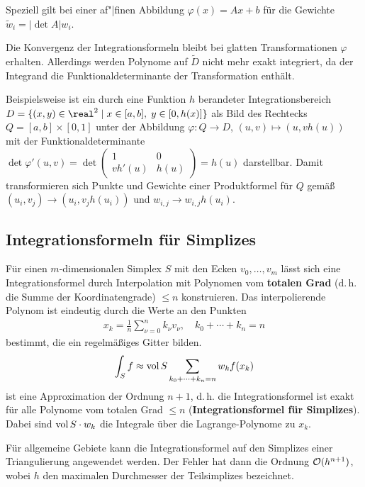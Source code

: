 Speziell gilt bei einer af"|finen Abbildung
$\varphi(x) = Ax + b$ für die Gewichte
$\widetilde{w}_i = |\det A| w_i$.

Die Konvergenz der Integrationsformeln bleibt bei glatten Transformationen
$\varphi$ erhalten.
Allerdings werden Polynome auf $\widetilde{D}$ nicht mehr exakt integriert, da
der Integrand die Funktionaldeterminante der Transformation enthält.

\linie

Beispielsweise ist ein durch eine Funktion $h$ berandeter
Integrationsbereich \\
$D = \{(x, y) \in \real^2 \;|\; x \in [a, b],\; y \in [0, h(x)]\}$
als Bild des Rechtecks $Q = [a, b] \times [0, 1]$ unter der Abbildung
$\varphi\colon Q \rightarrow D$, $(u, v) \mapsto (u, v h(u))$ mit der
Funktionaldeterminante \\
$\det \varphi'(u, v) =
\det\begin{pmatrix}1 & 0\\vh'(u) & h(u)\end{pmatrix} = h(u)$
darstellbar.
Damit transformieren sich Punkte und Gewichte einer Produktformel für $Q$
gemäß $(u_i, v_j) \rightarrow (u_i, v_j h(u_i))$ und
$w_{i,j} \rightarrow w_{i,j} h(u_i)$.

\subsection{%
    Integrationsformeln für Simplizes%
}

Für einen $m$-dimensionalen Simplex $S$ mit den Ecken $v_0, \dotsc, v_m$ lässt
sich eine Integrationsformel durch Interpolation mit Polynomen vom
\textbf{totalen Grad}
(d.\,h. die Summe der Koordinatengrade) $\le n$ konstruieren.
Das interpolierende Polynom ist eindeutig durch die Werte an den Punkten
\begin{align*}
    x_k = \frac{1}{n} \sum_{\nu=0}^n k_\nu v_\nu, \quad
    k_0 + \dotsb + k_n = n
\end{align*}
bestimmt, die ein regelmäßiges Gitter bilden.
\begin{align*}
    \int_S f \approx
    \operatorname{vol} S \sum_{k_0 + \dotsb + k_n = n} w_k f(x_k)
\end{align*}
ist eine Approximation der Ordnung $n + 1$, d.\,h.
die Integrationsformel ist exakt für alle Polynome vom totalen Grad $\le n$
(\textbf{Integrationsformel für Simplizes}).
Dabei sind $\operatorname{vol} S \cdot w_k$ die Integrale über die Lagrange-Polynome
zu $x_k$.

Für allgemeine Gebiete kann die Integrationsformel auf den Simplizes einer
Triangulierung angewendet werden.
Der Fehler hat dann die Ordnung $\mathcal{O}(h^{n+1})$, wobei $h$ den maximalen
Durchmesser der Teilsimplizes bezeichnet.

